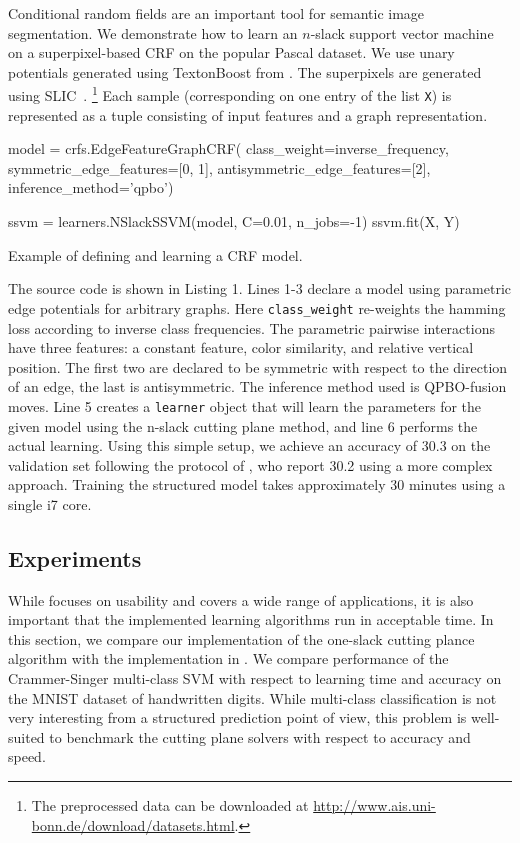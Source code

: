 Conditional random fields are an important tool for semantic image
segmentation.  We demonstrate how to learn an $n$-slack support
vector machine on a superpixel-based CRF on the popular Pascal dataset. We use
unary potentials generated using TextonBoost
from \citet{krahenbuhl2012efficient}. The superpixels are generated using SLIC~\citep{achanta2012slic}.%
\footnote{The preprocessed data can be downloaded at \url{http://www.ais.uni-bonn.de/download/datasets.html}.}
Each sample (corresponding on one entry of the list \texttt{X}) is represented as a
tuple consisting of input features and a graph representation.
\begin{listing}[t]
\begin{pythoncode}
model = crfs.EdgeFeatureGraphCRF(
    class_weight=inverse_frequency, symmetric_edge_features=[0, 1],
    antisymmetric_edge_features=[2], inference_method='qpbo')

ssvm = learners.NSlackSSVM(model, C=0.01, n_jobs=-1)
ssvm.fit(X, Y)
\end{pythoncode}
\caption{Example of defining and learning a CRF model.\label{lst:stuff}}
\end{listing}

The source code is shown in Listing 1.
Lines 1-3 declare a model using parametric edge potentials for arbitrary graphs.
Here \texttt{class\_weight} re-weights the hamming loss according to inverse class
frequencies. The parametric pairwise interactions have three features: a
constant feature, color similarity, and relative vertical position. The first two
are declared to be symmetric with respect to the direction of an edge, the last
is antisymmetric. The inference method used is QPBO-fusion moves.  Line 5
creates a \texttt{learner} object that will learn the parameters for the given
model using the n-slack cutting plane method, and line 6 performs the actual
learning.  Using this simple setup, we achieve an accuracy of 30.3 on the
validation set following the protocol of \citet{krahenbuhl2012efficient}, who
report 30.2 using a more complex approach. Training the structured model takes
approximately 30 minutes using a single i7 core.

\subsection{Experiments}\label{sec:benchmarks}
While \pystruct focuses on usability and covers a wide range of applications, it is also
important that the implemented learning algorithms run in acceptable time.
In this section, we compare our implementation of the one-slack cutting plance
algorithm with the implementation in \svmstruct.
We compare performance of the Crammer-Singer multi-class SVM with respect to
learning time and accuracy on the MNIST dataset of handwritten digits.
While multi-class classification is not very interesting from a structured
prediction point of view, this problem is well-suited to benchmark the cutting
plane solvers with respect to accuracy and speed.

